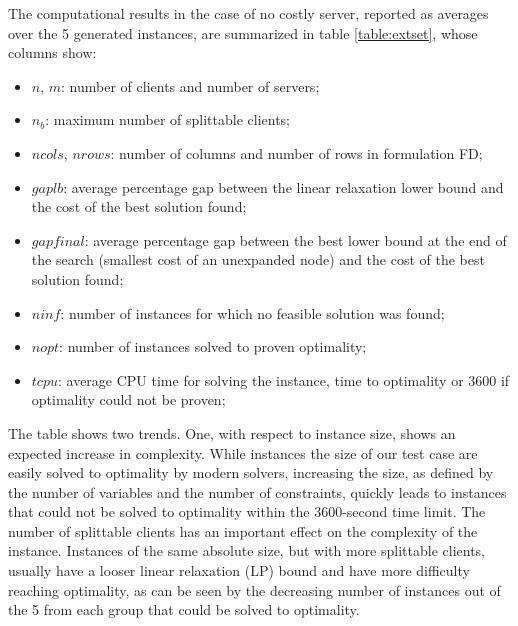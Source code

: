 \documentclass[opre,sglanonrev,11pt]{informs4}
\begin{document}
The computational results in the case of no costly server, reported as averages over the 5 generated instances, are summarized in table \ref{table:extset}, whose columns show:
\begin{itemize}
	\item $n$, $m$: number of clients and number of servers;
	\item $n_b$: maximum number of splittable clients;
	\item $ncols$, $nrows$: number of columns and number of rows in formulation FD;
	\item $gaplb$: average percentage gap between the linear relaxation lower bound and the cost of the best solution found;
	\item $gapfinal$: average percentage gap between the best lower bound at the end of the search (smallest cost of an unexpanded node) and the cost of the best solution found;
	\item $ninf$: number of instances for which no feasible solution was found;
	\item $nopt$: number of instances solved to proven optimality;
	\item $tcpu$: average CPU time for solving the instance, time to optimality or 3600 if optimality could not be proven;
\end{itemize}

The table shows two trends. One, with respect to instance size, shows an expected increase in complexity. While instances the size of our test case are easily solved to optimality by modern solvers, increasing the size, as defined by the number of variables and the number of constraints, quickly leads to instances that could not be solved to optimality within the 3600-second time limit. 
The number of splittable clients has an important effect on the complexity of the instance. Instances of the same absolute size, but with more splittable clients, usually have a looser linear relaxation (LP) bound and have more difficulty reaching optimality, as can be seen by the decreasing number of instances out of the 5 from each group that could be solved to optimality.
\end{document}
